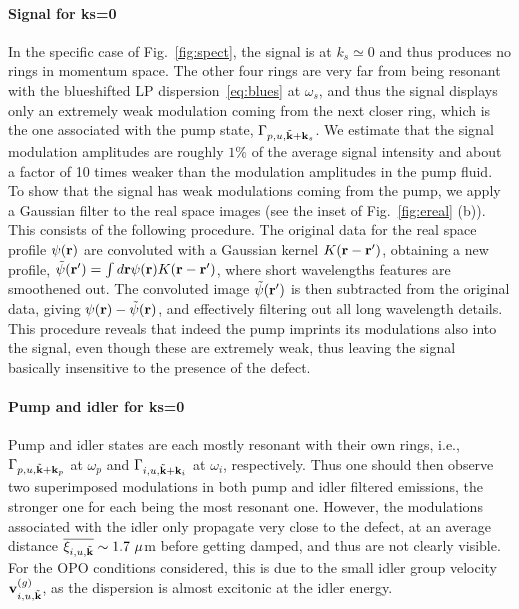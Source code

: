 \paragraph{Signal for ks=0}
In the specific case of Fig.~\ref{fig:spect}, the signal is at $k_s
\simeq 0$ and thus produces no rings in momentum space. The other four
rings are very far from being resonant with the blueshifted LP
dispersion~\eqref{eq:blues} at $\omega_s$, and thus the signal
displays only an extremely weak modulation coming from the next
closer ring, which is the one associated with the pump state,
$\Gamma_{p,u, \tilde{\mathbf{k}}+\mathbf{k}_s}$.
%
We estimate that the signal modulation amplitudes are roughly $1\%$ of
the average signal intensity and about a factor of 10 times weaker
than the modulation amplitudes in the pump fluid.
%
To show that the signal has weak modulations coming from
the pump, we apply a Gaussian filter to the real space images (see the
inset of Fig.~\ref{fig:ereal} (b)).
%
This consists of the following procedure. The original data for the
real space profile $\psi(\mathbf{r})$ are convoluted with a Gaussian
kernel $K(\mathbf{r} - \mathbf{r}')$, obtaining a new profile,
$\tilde{\psi}(\mathbf{r}') = \int d\mathbf{r} \psi (\mathbf{r}) K(\mathbf{r} -
\mathbf{r}')$, where short wavelengths features are smoothened out. The
convoluted image $\tilde{\psi}(\mathbf{r}')$ is then subtracted from the
original data, giving $\psi(\mathbf{r}) - \tilde{\psi}(\mathbf{r})$, and
effectively filtering out all long wavelength details.
%
This procedure reveals that indeed the pump imprints its modulations
also into the signal, even though these are extremely weak, thus
leaving the signal basically insensitive to the presence of the
defect.

\paragraph{Pump and idler for ks=0}
Pump and idler states are each mostly resonant with their own
rings, i.e., $\Gamma_{p,u, \tilde{\mathbf{k}}+\mathbf{k}_p}$ at $\omega_p$
and $\Gamma_{i,u, \tilde{\mathbf{k}}+\mathbf{k}_i}$ at $\omega_i$,
respectively. Thus one should then observe two superimposed
modulations in both pump and idler filtered emissions, the stronger
one for each being the most resonant one.
%
However, the modulations associated with the idler only propagate very
close to the defect, at an average distance
$\overline{\xi_{i,u,\tilde{\mathbf{k}}}} \sim 1.7~\mu$m before getting
damped, and thus are not clearly visible. For the OPO conditions
considered, this is due to the small idler group velocity
$\mathbf{v}_{i,u,\tilde{\mathbf{k}}}^{(g)}$, as the dispersion is almost
excitonic at the idler energy.

